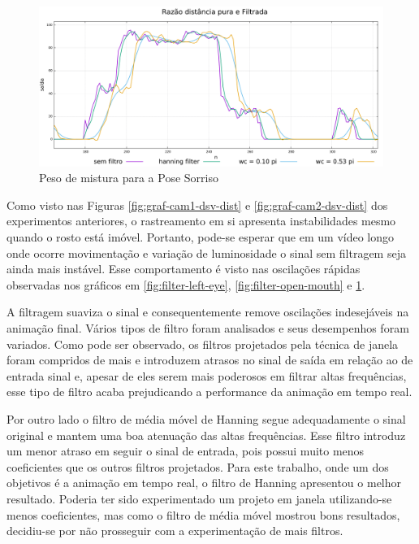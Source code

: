 \begin{figure}[!htb]
\centering
\includegraphics[width=1.0\textwidth]{figs/filter-result-smile.pdf} 
\caption{Peso de mistura para a Pose Sorriso}
\label{fig:filter-smile}
\end{figure}

Como visto nas Figuras \ref{fig:graf-cam1-dsv-dist} e \ref{fig:graf-cam2-dsv-dist} dos experimentos anteriores, o rastreamento em si apresenta instabilidades mesmo quando o rosto está imóvel. Portanto, pode-se esperar que em um vídeo longo onde ocorre movimentação e variação de luminosidade o sinal sem filtragem seja ainda mais instável. Esse comportamento é visto nas oscilações rápidas observadas nos gráficos em \ref{fig:filter-left-eye}, \ref{fig:filter-open-mouth} e \ref{fig:filter-smile}. 

A filtragem suaviza o sinal e consequentemente remove oscilações indesejáveis na animação final. Vários tipos de filtro foram analisados e seus desempenhos foram variados. Como pode ser observado, os filtros projetados pela técnica de janela foram compridos de mais e introduzem atrasos no sinal de saída em relação ao de entrada sinal e, apesar de eles serem mais poderosos em filtrar altas frequências, esse tipo de filtro acaba prejudicando a performance da animação em tempo real. 

Por outro lado o filtro de média móvel de Hanning segue adequadamente o sinal original e mantem uma boa atenuação das altas frequências. Esse filtro introduz um menor atraso em seguir o sinal de entrada, pois possui muito menos coeficientes que os outros filtros projetados. Para este trabalho, onde um dos objetivos é a animação em tempo real, o filtro de Hanning apresentou o melhor resultado. Poderia ter sido experimentado um projeto em janela utilizando-se menos coeficientes, mas como o filtro de média móvel mostrou bons resultados, decidiu-se por não prosseguir com a experimentação de mais filtros.

